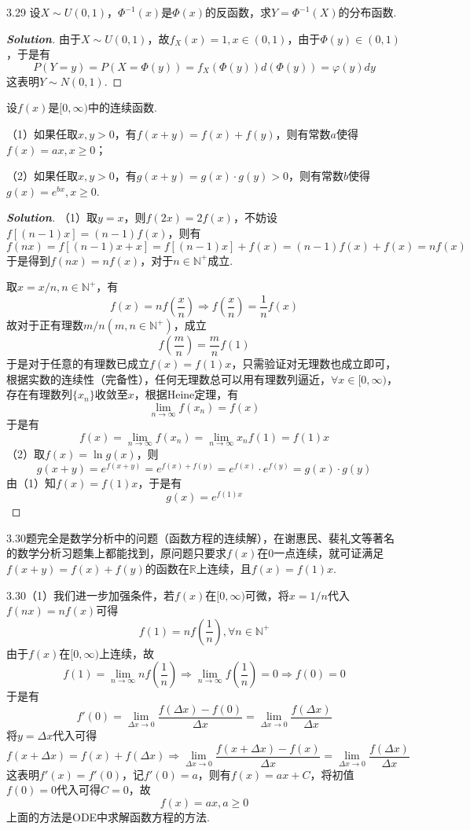 \documentclass[10pt, a4paper, oneside]{ctexart}
\newenvironment{solution}{\begin{proof}[\bf Solution]}{\end{proof}}
\begin{document}
3.29 设$X \sim  U(0,1)$，$\Phi^{-1}(x)$是$\Phi(x)$的反函数，求$Y=\Phi^{-1} (X)$的分布函数.
\begin{solution}
由于$X\sim U(0,1)$，故$f_X(x)=1,x\in(0,1)$，由于$\Phi(y)\in (0,1)$，于是有
    \[P(Y=y)=P(X=\Phi(y))=f_X(\Phi(y))d(\Phi(y))=\varphi(y)dy\]
这表明$Y\sim N(0,1)$.
\end{solution}
 设$f(x)$是$[0,\infty)$中的连续函数.

（1）如果任取$x,y>0$，有$f(x+y)=f(x)+f(y)$，则有常数$a$使得$f(x)=ax,x\geqslant 0$；

（2）如果任取$x,y>0$，有$g(x+y)=g(x)\cdot g(y)>0$，则有常数$b$使得$g(x)=e^{bx},x\geqslant 0$.
\begin{solution}
（1）取$y=x$，则$f(2x)=2f(x)$，不妨设$f[(n-1)x]=(n-1)f(x)$，则有
\[f(nx) = f[(n - 1)x + x] = f[(n - 1)x] + f(x) = (n - 1)f(x) + f(x) = nf(x)\]
于是得到$f(nx)=nf(x)$，对于$n\in \mathbb{N}^+$成立.

取$x=x/n,n\in \mathbb{N}^+$，有
\[f(x) = nf(\frac{x}{n}) \Rightarrow f(\frac{x}{n}) = \frac{1}{n}f(x)\]
故对于正有理数$m/n(m,n\in \mathbb{N}^+)$，成立
\[f(\frac{m}{n}) = \frac{m}{n}f(1)\]
于是对于任意的有理数已成立$f(x)=f(1)x$，只需验证对无理数也成立即可，根据实数的连续性（完备性），任何无理数总可以用有理数列逼近，$\forall x\in [0,\infty)$，存在有理数列$\{x_n\}$收敛至$x$，根据Heine定理，有
\[\mathop {\lim }\limits_{n \to \infty } f({x_n}) = f(x)\]
于是有
\[f(x) = \mathop {\lim }\limits_{n \to \infty } f({x_n}) = \mathop {\lim }\limits_{n \to \infty } {x_n}f(1) = f(1)x\]
（2）取$f(x)=\ln g(x)$，则
\[g(x + y) = {e^{f(x + y)}} = {e^{f(x) + f(y)}} = {e^{f(x)}} \cdot {e^{f(y)}} = g(x) \cdot g(y)\]
由（1）知$f(x)=f(1)x$，于是有
\[g(x) = {e^{f(1)x}}\]
\end{solution}
\begin{remark}
3.30题完全是数学分析中的问题（函数方程的连续解），在谢惠民、裴礼文等著名的数学分析习题集上都能找到，原问题只要求$f(x)$在$0$一点连续，就可证满足$f(x+y)=f(x)+f(y)$的函数在$\mathbb{R}$上连续，且$f(x)=f(1)x$.
\end{remark}
\begin{remark}
3.30（1）我们进一步加强条件，若$f(x)$在$[0,\infty)$可微，将$x=1/n$代入$f(nx)=nf(x)$可得
\[f(1) = nf(\frac{1}{n}),\forall n{ \in \mathbb{N}^ + }\]
由于$f(x)$在$[0,\infty)$上连续，故
\[f(1) = \mathop {\lim }\limits_{n \to \infty } nf(\frac{1}{n}) \Rightarrow \mathop {\lim }\limits_{n \to \infty } f(\frac{1}{n}) = 0 \Rightarrow f(0) = 0\]
于是有
\[f'(0) = \mathop {\lim }\limits_{\Delta x \to 0} \frac{{f(\Delta x) - f(0)}}{{\Delta x}} = \mathop {\lim }\limits_{\Delta x \to 0} \frac{{f(\Delta x)}}{{\Delta x}}\]
将$y=\Delta x$代入可得
\[f(x + \Delta x) = f(x) + f(\Delta x) \Rightarrow \mathop {\lim }\limits_{\Delta x \to 0} \frac{{f(x + \Delta x) - f(x)}}{{\Delta x}} = \mathop {\lim }\limits_{\Delta x \to 0} \frac{{f(\Delta x)}}{{\Delta x}}\]
这表明$f'(x)=f'(0)$，记$f'(0)=a$，则有$f(x)=ax+C$，将初值$f(0)=0$代入可得$C=0$，故
\[f(x) = ax,a \geqslant 0\]
上面的方法是ODE中求解函数方程的方法.
\end{remark}
\end{document}

